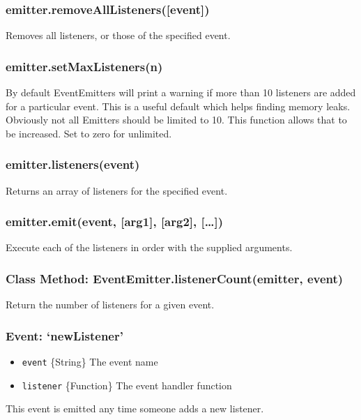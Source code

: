 \subsubsection{emitter.removeAllListeners({[}event{]})}

Removes all listeners, or those of the specified event.

\subsubsection{emitter.setMaxListeners(n)}

By default EventEmitters will print a warning if more than 10 listeners
are added for a particular event. This is a useful default which helps
finding memory leaks. Obviously not all Emitters should be limited to
10. This function allows that to be increased. Set to zero for
unlimited.

\subsubsection{emitter.listeners(event)}

Returns an array of listeners for the specified event.

\begin{Shaded}
\begin{Highlighting}[]
\NormalTok{(}\NormalTok{, } 
  \NormalTok{(}\NormalTok{);}
\NormalTok{\});}
\NormalTok{(}\NormalTok{(}\NormalTok{(}\NormalTok{))); }\CommentTok{// [ [Function] ]}
\end{Highlighting}
\end{Shaded}

\subsubsection{emitter.emit(event, {[}arg1{]}, {[}arg2{]},
{[}\ldots{}{]})}

Execute each of the listeners in order with the supplied arguments.

\subsubsection{Class Method: EventEmitter.listenerCount(emitter, event)}

Return the number of listeners for a given event.

\subsubsection{Event: `newListener'}

\begin{itemize}
\item
  \texttt{event} \{String\} The event name
\item
  \texttt{listener} \{Function\} The event handler function
\end{itemize}

This event is emitted any time someone adds a new listener.
